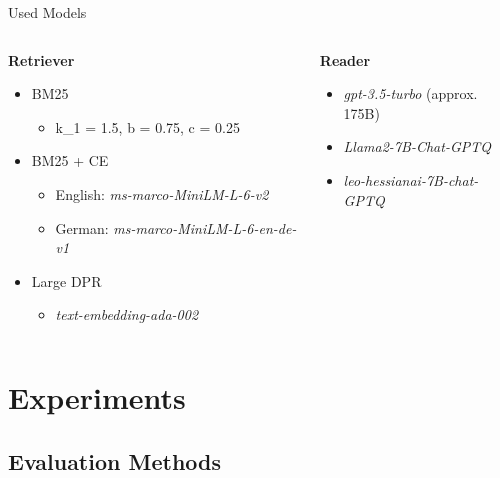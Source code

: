 \documentclass{beamer}
\begin{document}
\begin{frame}{Used Models}
  \begin{columns}[T] %
    \begin{column}{.5\textwidth}
      \textbf{Retriever}
      \begin{itemize}
        \item BM25\footnotemark[1]
          \begin{itemize}
            \item k\_1 = 1.5, b = 0.75, c = 0.25
          \end{itemize}
        \item BM25 + CE
          \begin{itemize}
            \item English: \emph{ms-marco-MiniLM-L-6-v2}\footnotemark[2]
            \item German: \emph{ms-marco-MiniLM-L-6-en-de-v1}\footnotemark[3]
          \end{itemize}
        \item Large DPR
          \begin{itemize}
            \item \emph{text-embedding-ada-002}\footnotemark[4]
          \end{itemize}
      \end{itemize}
    \end{column}
    \begin{column}{.5\textwidth}
      \textbf{Reader}
      \begin{itemize}
        \item \emph{gpt-3.5-turbo} (approx. 175B)\footnotemark[5]
        \item \emph{Llama2-7B-Chat-GPTQ}\footnotemark[6]
        \item \emph{leo-hessianai-7B-chat-GPTQ}\footnotemark[7]
      \end{itemize}
    \end{column}
  \end{columns}
\end{frame}

\section[Experiments]{Experiments}

\subsection*{Evaluation Methods}
\end{document}
